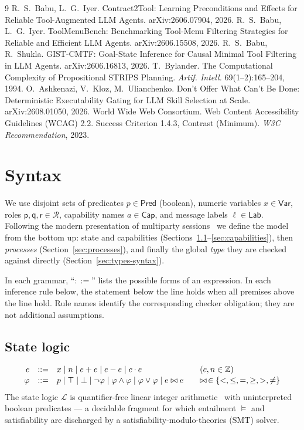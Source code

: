 \documentclass{article}
\theoremstyle{plain}
\theoremstyle{definition}
\newcommand{\CapS}{\mathsf{Cap}}
\newcommand{\Pred}{\mathsf{Pred}}
\newcommand{\Var}{\mathsf{Var}}
\newcommand{\Lab}{\mathsf{Lab}}
\def \bmr {}
\def \emr {}
\newcommand{\bnew}{\begingroup\color{revblue}}
\newcommand{\bnew}{\begingroup}
\newcommand{\enew}{\endgroup}
\newcommand{\new}[1]{{\bnew #1\enew}}
\begin{document}
\begin{thebibliography}{9}
 \new{R.~S.~Babu, L.~G.~Iyer. Contract2Tool: Learning Preconditions and Effects for Reliable Tool-Augmented LLM Agents. arXiv:2606.07904, 2026.}
 \new{R.~S.~Babu, L.~G.~Iyer. ToolMenuBench: Benchmarking Tool-Menu Filtering Strategies for Reliable and Efficient LLM Agents. arXiv:2606.15508, 2026.}
 \new{R.~S.~Babu, R.~Shukla. GIST-CMTF: Goal-State Inference for Causal Minimal Tool Filtering in LLM Agents. arXiv:2606.16813, 2026.}
 \new{T.~Bylander. The Computational Complexity of Propositional STRIPS Planning. \emph{Artif. Intell.} 69(1--2):165--204, 1994.}
 \new{O.~Ashkenazi, V.~Kloz, M.~Ulianchenko. Don't Offer What Can't Be Done: Deterministic Executability Gating for LLM Skill Selection at Scale. arXiv:2608.01050, 2026.}
 World Wide Web Consortium. Web Content Accessibility Guidelines
(WCAG) 2.2. Success Criterion 1.4.3, Contrast (Minimum).
\emph{W3C Recommendation}, 2023.
\end{thebibliography}

\appendix
\section{Syntax}\label{app:syntax}

We use disjoint sets of predicates $p\in\Pred$ (boolean), numeric variables
$x\in\Var$, roles $\mathsf{p},\mathsf{q},\mathsf{r}\in\mathcal R$, capability names
$a\in\CapS$, and message labels $\ell\in\Lab$. Following the modern
presentation of multiparty \bmr sessions~\cite{synthetic2023,synthetic2026} \emr
we define the model from the bottom up: state and capabilities
(Sections~\ref{sec:state-logic}--\ref{sec:capabilities}), then
\emph{processes} (Section~\ref{sec:processes}), and finally the global
\emph{type} they are checked against directly (Section~\ref{sec:types-syntax}).

In each grammar, ``$::=$'' lists the possible forms of an expression. In each
inference rule below, the statement below the line holds when all premises
above the line hold. Rule names identify the corresponding checker obligation;
they are not additional assumptions.


\subsection{State logic}\label{sec:state-logic}
\[
\begin{array}{rcl@{\qquad}l}
e &::=& x \mid n \mid e+e \mid e-e \mid c\cdot e & (c,n\in\mathbb Z)\\[1pt]
\varphi &::=& p \mid \top \mid \bot \mid \neg\varphi \mid \varphi\wedge\varphi
  \mid \varphi\vee\varphi \mid e\bowtie e & \bowtie\,\in\{<,\le,=,\ge,>,\ne\}
\end{array}
\]
The state logic $\mathcal L$ is quantifier-free linear integer arithmetic~\cite{smtlib} with
uninterpreted boolean predicates --- a decidable fragment for which entailment
$\vDash$ and satisfiability are discharged by a satisfiability-modulo-theories
(SMT) solver.
\end{document}

